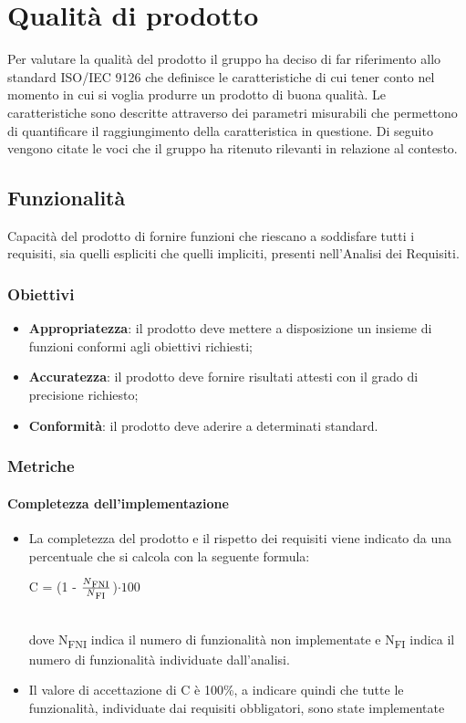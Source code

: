 \section{Qualità di prodotto}
Per valutare la qualità del prodotto il gruppo ha deciso di far riferimento allo standard ISO/IEC 9126\glosp{} che definisce le caratteristiche di cui tener conto nel momento in cui si voglia produrre un prodotto di buona qualità. Le caratteristiche sono descritte attraverso dei parametri misurabili che permettono di quantificare il raggiungimento della caratteristica in questione. Di seguito vengono citate le voci che il gruppo ha ritenuto rilevanti in relazione al contesto.
	\subsection{Funzionalità}
	Capacità del prodotto di fornire funzioni che riescano a soddisfare tutti i requisiti, sia quelli espliciti che quelli impliciti, presenti nell'Analisi dei Requisiti.
		\subsubsection{Obiettivi}
		\begin{itemize}
			\item \textbf{Appropriatezza}: il prodotto deve mettere a disposizione un insieme di funzioni conformi agli obiettivi richiesti;
			\item \textbf{Accuratezza}: il prodotto deve fornire risultati attesti con il grado di precisione richiesto;
			\item \textbf{Conformità}: il prodotto deve aderire a determinati standard. %
		\end{itemize}
		\subsubsection{Metriche}
			\paragraph{Completezza dell'implementazione}
			\begin{itemize}
			\item La completezza del prodotto e il rispetto dei requisiti viene indicato da una percentuale che si calcola con la seguente formula: \\
			\centerline { C = (1 - \(\frac{N\textsubscript{FNI}}{N\textsubscript{FI}} \))$ \cdot  100$ } \\
			dove N\textsubscript{FNI} indica il numero di funzionalità non implementate e N\textsubscript{FI} indica il numero di funzionalità individuate dall'analisi.
			\item Il valore di accettazione di C è 100\%, a indicare quindi che tutte le funzionalità, individuate dai requisiti obbligatori, sono state implementate
			\end{itemize}
